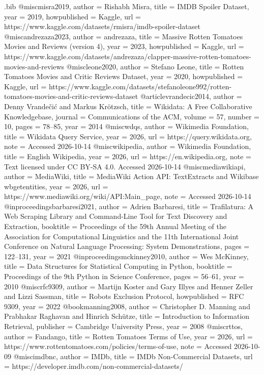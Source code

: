 \begin{filecontents*}[overwrite]{\jobname.bib}
  @misc{misra2019,
    author = {Rishabh Misra},
    title = {{IMDB} Spoiler Dataset},
    year = {2019},
    howpublished = {Kaggle},
    url = {https://www.kaggle.com/datasets/rmisra/imdb-spoiler-dataset}
  }
  @misc{andrezaza2023,
    author = {andrezaza},
    title = {Massive Rotten Tomatoes Movies and Reviews (version 4)},
    year = {2023},
    howpublished = {Kaggle},
    url = {https://www.kaggle.com/datasets/andrezaza/clapper-massive-rotten-tomatoes-movies-and-reviews}
  }
  @misc{leone2020,
    author = {Stefano Leone},
    title = {Rotten Tomatoes Movies and Critic Reviews Dataset},
    year = {2020},
    howpublished = {Kaggle},
    url = {https://www.kaggle.com/datasets/stefanoleone992/rotten-tomatoes-movies-and-critic-reviews-dataset}
  }
  @article{vrandecic2014,
    author = {Denny Vrande{\v{c}}i{\'c} and Markus Kr{\"o}tzsch},
    title = {Wikidata: A Free Collaborative Knowledgebase},
    journal = {Communications of the ACM},
    volume = {57},
    number = {10},
    pages = {78--85},
    year = {2014}
  }
  @misc{wdqs,
    author = {{Wikimedia Foundation}},
    title = {Wikidata Query Service},
    year = {2026},
    url = {https://query.wikidata.org},
    note = {Accessed 2026-10-14}
  }
  @misc{wikipedia,
    author = {{Wikimedia Foundation}},
    title = {English Wikipedia},
    year = {2026},
    url = {https://en.wikipedia.org},
    note = {Text licensed under CC BY-SA 4.0. Accessed 2026-10-14}
  }
  @misc{mediawikiapi,
    author = {{MediaWiki}},
    title = {MediaWiki Action API: TextExtracts and Wikibase wbgetentities},
    year = {2026},
    url = {https://www.mediawiki.org/wiki/API:Main_page},
    note = {Accessed 2026-10-14}
  }
  @inproceedings{barbaresi2021,
    author = {Adrien Barbaresi},
    title = {Trafilatura: A Web Scraping Library and Command-Line Tool for Text Discovery and Extraction},
    booktitle = {Proceedings of the 59th Annual Meeting of the Association for Computational Linguistics and the 11th International Joint Conference on Natural Language Processing: System Demonstrations},
    pages = {122--131},
    year = {2021}
  }
  @inproceedings{mckinney2010,
    author = {Wes McKinney},
    title = {Data Structures for Statistical Computing in Python},
    booktitle = {Proceedings of the 9th Python in Science Conference},
    pages = {56--61},
    year = {2010}
  }
  @misc{rfc9309,
    author = {Martijn Koster and Gary Illyes and Henner Zeller and Lizzi Sassman},
    title = {Robots Exclusion Protocol},
    howpublished = {RFC 9309},
    year = {2022}
  }
  @book{manning2008,
    author = {Christopher D. Manning and Prabhakar Raghavan and Hinrich Sch{\"u}tze},
    title = {Introduction to Information Retrieval},
    publisher = {Cambridge University Press},
    year = {2008}
  }
  @misc{rttos,
    author = {Fandango},
    title = {Rotten Tomatoes Terms of Use},
    year = {2026},
    url = {https://www.rottentomatoes.com/policies/terms-of-use},
    note = {Accessed 2026-10-09}
  }
  @misc{imdbnc,
    author = {IMDb},
    title = {{IMDb} Non-Commercial Datasets},
    url = {https://developer.imdb.com/non-commercial-datasets/}
  }
\end{filecontents*}

